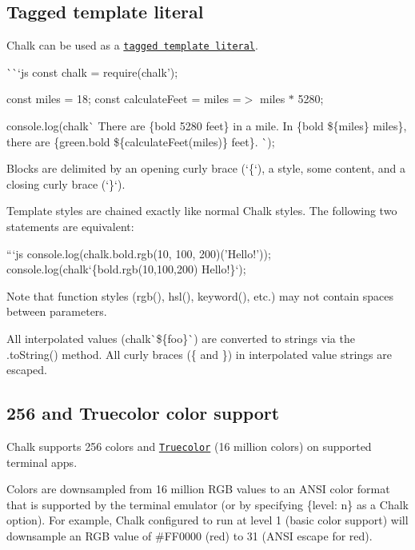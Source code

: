 \subsection*{Tagged template literal}

Chalk can be used as a \href{http://exploringjs.com/es6/ch_template-literals.html#_tagged-template-literals}{\tt tagged template literal}.

\`{}\`{}`js const chalk = require(\textquotesingle{}chalk');

const miles = 18; const calculate\+Feet = miles =$>$ miles $\ast$ 5280;

console.\+log(chalk\`{} There are \{bold 5280 feet\} in a mile. In \{bold \$\{miles\} miles\}, there are \{green.\+bold \$\{calculate\+Feet(miles)\} feet\}. \`{}); 
\begin{DoxyCode}
Blocks are delimited by an opening curly brace (`\{`), a style, some content, and a closing curly brace
       (`\}`).

Template styles are chained exactly like normal Chalk styles. The following two statements are equivalent:

```js
console.log(chalk.bold.rgb(10, 100, 200)('Hello!'));
console.log(chalk`\{bold.rgb(10,100,200) Hello!\}`);
\end{DoxyCode}


Note that function styles ({\ttfamily rgb()}, {\ttfamily hsl()}, {\ttfamily keyword()}, etc.) may not contain spaces between parameters.

All interpolated values ({\ttfamily chalk\`{}\$\{foo\}\`{}}) are converted to strings via the {\ttfamily .to\+String()} method. All curly braces ({\ttfamily \{} and {\ttfamily \}}) in interpolated value strings are escaped.

\subsection*{256 and Truecolor color support}

Chalk supports 256 colors and \href{https://gist.github.com/XVilka/8346728}{\tt Truecolor} (16 million colors) on supported terminal apps.

Colors are downsampled from 16 million R\+GB values to an A\+N\+SI color format that is supported by the terminal emulator (or by specifying {\ttfamily \{level\+: n\}} as a Chalk option). For example, Chalk configured to run at level 1 (basic color support) will downsample an R\+GB value of \#\+F\+F0000 (red) to 31 (A\+N\+SI escape for red).

